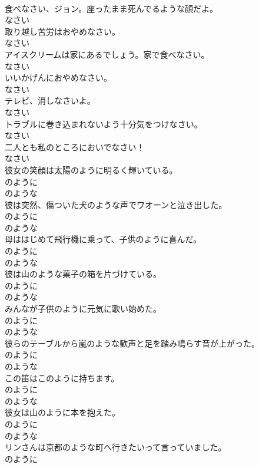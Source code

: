 \documentclass[8pt]{extreport}
\begin{document}
\begin{CJK}{UTF8}{min}
\\	食べなさい、ジョン。座ったまま死んでるような顔だよ。	
\\	なさい	
\\	取り越し苦労はおやめなさい。	
\\	なさい	
\\	アイスクリームは家にあるでしょう。家で食べなさい。	
\\	なさい	
\\	いいかげんにおやめなさい。	
\\	なさい	
\\	テレビ、消しなさいよ。	
\\	なさい	
\\	トラブルに巻き込まれないよう十分気をつけなさい。	
\\	なさい	
\\	二人とも私のところにおいでなさい！	
\\	なさい	
\\	彼女の笑顔は太陽のように明るく輝いている。	
\\	のように 
\\	のような	
\\	彼は突然、傷ついた犬のような声でワオーンと泣き出した。	
\\	のように 
\\	のような	
\\	母ははじめて飛行機に乗って、子供のように喜んだ。	
\\	のように 
\\	のような	
\\	彼は山のような菓子の箱を片づけている。	
\\	のように 
\\	のような	
\\	みんなが子供のように元気に歌い始めた。	
\\	のように 
\\	のような	
\\	彼らのテーブルから嵐のような歓声と足を踏み鳴らす音が上がった。	
\\	のように 
\\	のような	
\\	この笛はこのように持ちます。	
\\	のように 
\\	のような	
\\	彼女は山のように本を抱えた。	
\\	のように 
\\	のような	
\\	リンさんは京都のような町へ行きたいって言っていました。	
\\	のように 

\end{CJK}
\end{document}
